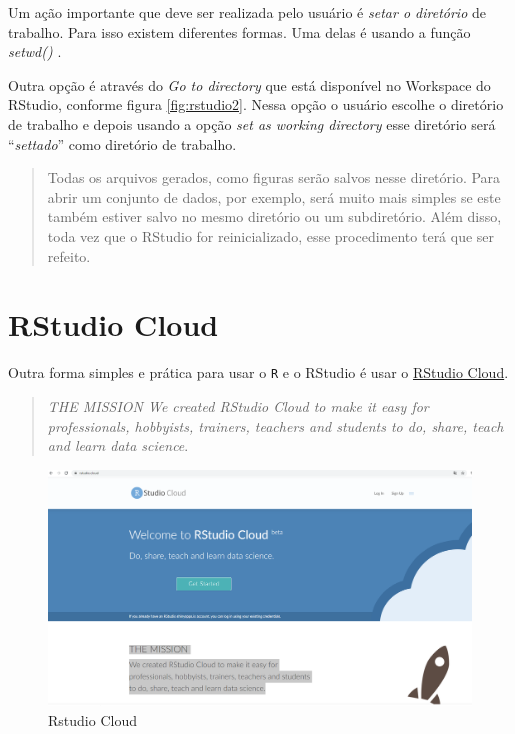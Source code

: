 \documentclass[
]{book}
\theoremstyle{definition}
\theoremstyle{definition}
\theoremstyle{definition}
\theoremstyle{remark}
\begin{document}
Um ação importante que deve ser realizada pelo usuário é \emph{setar o diretório} de trabalho. Para isso existem diferentes formas. Uma delas é usando a função \emph{setwd()} .

Outra opção é através do \emph{Go to directory} que está disponível no Workspace do RStudio, conforme figura \ref{fig:rstudio2}. Nessa opção o usuário escolhe o diretório de trabalho e depois usando a opção \emph{set as working directory} esse diretório será ``\emph{settado}'' como diretório de trabalho.

\begin{quote}
Todas os arquivos gerados, como figuras serão salvos nesse diretório. Para abrir um conjunto de dados, por exemplo, será muito mais simples se este também estiver salvo no mesmo diretório ou um subdiretório. Além disso, toda vez que o RStudio for reinicializado, esse procedimento terá que ser refeito.
\end{quote}

\hypertarget{rstudio-cloud}{%
\section{RStudio Cloud}\label{rstudio-cloud}}

Outra forma simples e prática para usar o \texttt{R} e o RStudio é usar o \href{https://rstudio.cloud/}{RStudio Cloud}.

\begin{quote}
\emph{THE MISSION
We created RStudio Cloud to make it easy for professionals, hobbyists, trainers, teachers and students to do, share, teach and learn data science}. \citep{rstudiocloud}
\end{quote}

\begin{figure}
\includegraphics[width=0.9\linewidth]{Figuras/RStudioCloud} \caption{Rstudio Cloud}\label{fig:rstudiocloud}
\end{figure}
\end{document}
